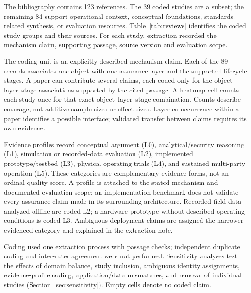 The bibliography contains 123 references. The 39 coded studies are a subset; the remaining 84 support operational context, conceptual foundations, standards, related synthesis, or evaluation resources. Table~\ref{tab:reviews} identifies the coded study groups and their sources. For each study, extraction recorded the mechanism claim, supporting passage, source version and evaluation scope.

The coding unit is an explicitly described mechanism claim. Each of the 89 records associates one object with one assurance layer and the supported lifecycle stages. A paper can contribute several claims, each coded only for the object--layer--stage associations supported by the cited passage. A heatmap cell counts each study once for that exact object--layer--stage combination. Counts describe coverage, not additive sample sizes or effect sizes. Layer co-occurrence within a paper identifies a possible interface; validated transfer between claims requires its own evidence.

Evidence profiles record conceptual argument (L0), analytical/security reasoning (L1), simulation or recorded-data evaluation (L2), implemented prototype/testbed (L3), physical operating trials (L4), and sustained multi-party operation (L5). These categories are complementary evidence forms, not an ordinal quality score. A profile is attached to the stated mechanism and documented evaluation scope; an implementation benchmark does not validate every assurance claim made in its surrounding architecture. Recorded field data analyzed offline are coded L2; a hardware prototype without described operating conditions is coded L3. Ambiguous deployment claims are assigned the narrower evidenced category and explained in the extraction note.

Coding used one extraction process with passage checks; independent duplicate coding and inter-rater agreement were not performed. Sensitivity analyses test the effects of domain balance, study inclusion, ambiguous identity assignments, evidence-profile coding, application/data mismatches, and removal of individual studies (Section~\ref{sec:sensitivity}). Empty cells denote no coded claim.

